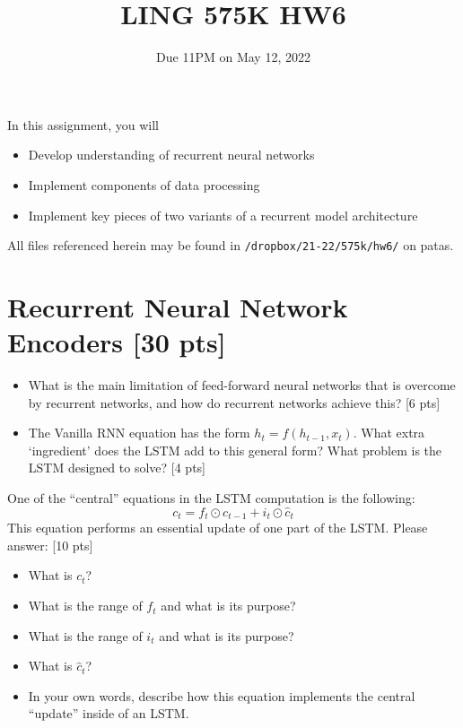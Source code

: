 \documentclass[11pt]{article}
\begin{document}
\title{LING 575K HW6}
\date{\vspace{-0.2in}Due 11PM on May 12, 2022}
\maketitle


\noindent In this assignment, you will 
\begin{itemize}
  \item Develop understanding of recurrent neural networks
  \item Implement components of data processing 
  \item Implement key pieces of two variants of a recurrent model architecture
\end{itemize}
All files referenced herein may be found in \texttt{/dropbox/21-22/575k/hw6/} on patas.


\section{Recurrent Neural Network Encoders [30 pts]}

\begin{itemize}
  \item What is the main limitation of feed-forward neural networks that is overcome by recurrent networks, and how do recurrent networks achieve this? \hfill [6 pts]
  \item The Vanilla RNN equation has the form $h_t = f(h_{t-1}, x_t)$.  What extra `ingredient' does the LSTM add to this general form?  What problem is the LSTM designed to solve? \hfill [4 pts]
\end{itemize}

\vspace{2em}
  One of the ``central'' equations in the LSTM computation is the following:
\[ c_t = f_t \odot c_{t-1} + i_t \odot \hat{c}_t \]
This equation performs an essential update of one part of the LSTM.  Please answer: \hfill [10 pts]
\begin{itemize}
  \item What is $c_t$?
  \item What is the range of $f_t$ and what is its purpose?
  \item What is the range of $i_t$ and what is its purpose?
  \item What is $\hat{c}_t$?
  \item In your own words, describe how this equation implements the central ``update'' inside of an LSTM.
\end{itemize}
\end{document}
